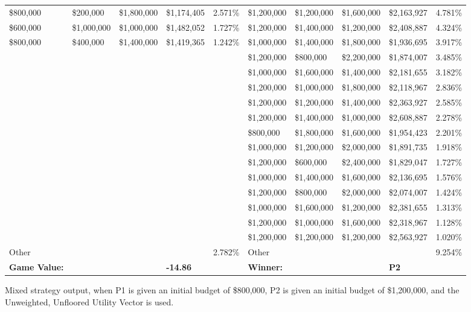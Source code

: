 \documentclass[11pt]{article}
\begin{document}
\begin{figure}
\begin{tabular}{ |p{1.0cm}p{1.0cm}p{1.0cm}p{2.0cm}|p{1.0cm}||p{1.0cm}p{1.0cm}p{1.0cm}p{2.0cm}|p{1.0cm}|}
\$800,000 & \$200,000 & \$1,800,000 & \$1,174,405 & 2.571\% & \$1,200,000 & \$1,200,000 & \$1,600,000 & \$2,163,927 & 4.781\% \\
\$600,000 & \$1,000,000 & \$1,000,000 & \$1,482,052 & 1.727\% & \$1,200,000 & \$1,400,000 & \$1,200,000 & \$2,408,887 & 4.324\% \\
\$800,000 & \$400,000 & \$1,400,000 & \$1,419,365 & 1.242\% & \$1,000,000 & \$1,400,000 & \$1,800,000 & \$1,936,695 & 3.917\% \\
& & & & & \$1,200,000 & \$800,000 & \$2,200,000 & \$1,874,007 & 3.485\% \\
& & & & & \$1,000,000 & \$1,600,000 & \$1,400,000 & \$2,181,655 & 3.182\% \\
& & & & & \$1,200,000 & \$1,000,000 & \$1,800,000 & \$2,118,967 & 2.836\% \\
& & & & & \$1,200,000 & \$1,200,000 & \$1,400,000 & \$2,363,927 & 2.585\% \\
& & & & & \$1,200,000 & \$1,400,000 & \$1,000,000 & \$2,608,887 & 2.278\% \\
& & & & & \$800,000 & \$1,800,000 & \$1,600,000 & \$1,954,423 & 2.201\% \\
& & & & & \$1,000,000 & \$1,200,000 & \$2,000,000 & \$1,891,735 & 1.918\% \\
& & & & & \$1,200,000 & \$600,000 & \$2,400,000 & \$1,829,047 & 1.727\% \\
& & & & & \$1,000,000 & \$1,400,000 & \$1,600,000 & \$2,136,695 & 1.576\% \\
& & & & & \$1,200,000 & \$800,000 & \$2,000,000 & \$2,074,007 & 1.424\% \\
& & & & & \$1,000,000 & \$1,600,000 & \$1,200,000 & \$2,381,655 & 1.313\% \\
& & & & & \$1,200,000 & \$1,000,000 & \$1,600,000 & \$2,318,967 & 1.128\% \\
& & & & & \$1,200,000 & \$1,200,000 & \$1,200,000 & \$2,563,927 & 1.020\% \\
\hline
Other& & & & 2.782\% & Other& & & & 9.254\% \\
\hline
\small \textbf{Game Value:} &&& \small \textbf{-14.86} && \small \textbf{Winner:} &&& \small \textbf{P2}&\\
\hline
\end{tabular}
\caption{Mixed strategy output, when P1 is given an initial budget of \$800,000, P2 is given an initial budget of \$1,200,000, and the Unweighted, Unfloored Utility Vector is used.}
\label{8v12table.4}
\end{figure}
\end{document}
